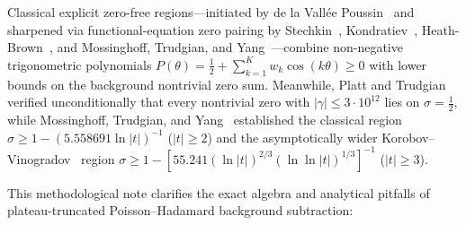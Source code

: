 \documentclass[11pt,reqno]{amsart}
\theoremstyle{definition}
\theoremstyle{remark}
\numberwithin{equation}{section}
\begin{document}
Classical explicit zero-free regions---initiated by de la Vall\'ee Poussin~\cite{dlvp1899} and sharpened via functional-equation zero pairing by Stechkin~\cite{stechkin1970}, Kondratiev~\cite{kondratiev1977}, Heath-Brown~\cite{heathbrown1992}, and Mossinghoff, Trudgian, and Yang~\cite{mty2024}---combine non-negative trigonometric polynomials $P(\theta) = \frac{1}{2} + \sum_{k=1}^K w_k\cos(k\theta) \ge 0$ with lower bounds on the background nontrivial zero sum. Meanwhile, Platt and Trudgian~\cite{platttrudgian2021} verified unconditionally that every nontrivial zero with $\lvert\gamma\rvert \le 3 \cdot 10^{12}$ lies on $\sigma = \frac{1}{2}$, while Mossinghoff, Trudgian, and Yang~\cite{mty2024} established the classical region $\sigma \ge 1 - (5.558691\ln\lvert t\rvert)^{-1}$ ($\lvert t\rvert \ge 2$) and the asymptotically wider Korobov--Vinogradov~\cite{korobov1958,vinogradov1958} region $\sigma \ge 1 - [55.241(\ln\lvert t\rvert)^{2/3}(\ln\ln\lvert t\rvert)^{1/3}]^{-1}$ ($\lvert t\rvert \ge 3$).

This methodological note clarifies the exact algebra and analytical pitfalls of plateau-truncated Poisson--Hadamard background subtraction:
\end{document}
